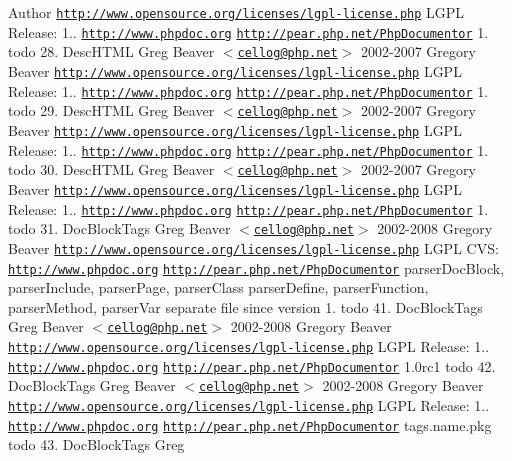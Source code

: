 \begin{DoxyAuthor}{\-Author}
\href{http://www.opensource.org/licenses/lgpl-license.php}{\tt http\-://www.\-opensource.\-org/licenses/lgpl-\/license.\-php} \-L\-G\-P\-L  \-Release\-: 1..  \href{http://www.phpdoc.org}{\tt http\-://www.\-phpdoc.\-org}  \href{http://pear.php.net/PhpDocumentor}{\tt http\-://pear.\-php.\-net/\-Php\-Documentor}  1.  todo 28.   \-Desc\-H\-T\-M\-L  \-Greg \-Beaver $<$\href{mailto:cellog@php.net}{\tt cellog@php.\-net}$>$  2002-\/2007 \-Gregory \-Beaver  \href{http://www.opensource.org/licenses/lgpl-license.php}{\tt http\-://www.\-opensource.\-org/licenses/lgpl-\/license.\-php} \-L\-G\-P\-L  \-Release\-: 1..  \href{http://www.phpdoc.org}{\tt http\-://www.\-phpdoc.\-org}  \href{http://pear.php.net/PhpDocumentor}{\tt http\-://pear.\-php.\-net/\-Php\-Documentor}  1.  todo 29.   \-Desc\-H\-T\-M\-L  \-Greg \-Beaver $<$\href{mailto:cellog@php.net}{\tt cellog@php.\-net}$>$  2002-\/2007 \-Gregory \-Beaver  \href{http://www.opensource.org/licenses/lgpl-license.php}{\tt http\-://www.\-opensource.\-org/licenses/lgpl-\/license.\-php} \-L\-G\-P\-L  \-Release\-: 1..  \href{http://www.phpdoc.org}{\tt http\-://www.\-phpdoc.\-org}  \href{http://pear.php.net/PhpDocumentor}{\tt http\-://pear.\-php.\-net/\-Php\-Documentor}  1.  todo 30.   \-Desc\-H\-T\-M\-L  \-Greg \-Beaver $<$\href{mailto:cellog@php.net}{\tt cellog@php.\-net}$>$  2002-\/2007 \-Gregory \-Beaver  \href{http://www.opensource.org/licenses/lgpl-license.php}{\tt http\-://www.\-opensource.\-org/licenses/lgpl-\/license.\-php} \-L\-G\-P\-L  \-Release\-: 1..  \href{http://www.phpdoc.org}{\tt http\-://www.\-phpdoc.\-org}  \href{http://pear.php.net/PhpDocumentor}{\tt http\-://pear.\-php.\-net/\-Php\-Documentor}  1.  todo 31.   \-Doc\-Block\-Tags  \-Greg \-Beaver $<$\href{mailto:cellog@php.net}{\tt cellog@php.\-net}$>$  2002-\/2008 \-Gregory \-Beaver  \href{http://www.opensource.org/licenses/lgpl-license.php}{\tt http\-://www.\-opensource.\-org/licenses/lgpl-\/license.\-php} \-L\-G\-P\-L  \-C\-V\-S\-:    \href{http://www.phpdoc.org}{\tt http\-://www.\-phpdoc.\-org}  \href{http://pear.php.net/PhpDocumentor}{\tt http\-://pear.\-php.\-net/\-Php\-Documentor}  parser\-Doc\-Block, parser\-Include, parser\-Page, parser\-Class  parser\-Define, parser\-Function, parser\-Method, parser\-Var  separate file since version 1.  todo 41.   \-Doc\-Block\-Tags  \-Greg \-Beaver $<$\href{mailto:cellog@php.net}{\tt cellog@php.\-net}$>$  2002-\/2008 \-Gregory \-Beaver  \href{http://www.opensource.org/licenses/lgpl-license.php}{\tt http\-://www.\-opensource.\-org/licenses/lgpl-\/license.\-php} \-L\-G\-P\-L  \-Release\-: 1..  \href{http://www.phpdoc.org}{\tt http\-://www.\-phpdoc.\-org}  \href{http://pear.php.net/PhpDocumentor}{\tt http\-://pear.\-php.\-net/\-Php\-Documentor}  1.\-0rc1  todo 42.   \-Doc\-Block\-Tags  \-Greg \-Beaver $<$\href{mailto:cellog@php.net}{\tt cellog@php.\-net}$>$  2002-\/2008 \-Gregory \-Beaver  \href{http://www.opensource.org/licenses/lgpl-license.php}{\tt http\-://www.\-opensource.\-org/licenses/lgpl-\/license.\-php} \-L\-G\-P\-L  \-Release\-: 1..  \href{http://www.phpdoc.org}{\tt http\-://www.\-phpdoc.\-org}  \href{http://pear.php.net/PhpDocumentor}{\tt http\-://pear.\-php.\-net/\-Php\-Documentor}  tags.\-name.\-pkg  todo 43.   \-Doc\-Block\-Tags  \-Greg 
\end{DoxyAuthor}
